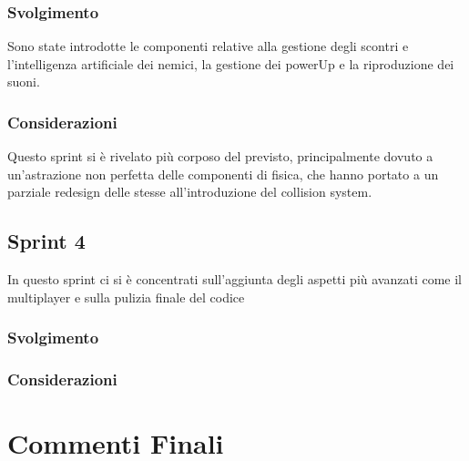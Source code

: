 \subsubsection{Svolgimento}
Sono state introdotte le componenti relative alla gestione degli scontri e l'intelligenza artificiale dei nemici, la gestione dei powerUp e la riproduzione dei suoni.
\subsubsection{Considerazioni}
Questo sprint si è rivelato più corposo del previsto, principalmente dovuto a un'astrazione non perfetta delle componenti di fisica, che hanno portato a un parziale redesign delle stesse all'introduzione del collision system.
\subsection{Sprint 4}
In questo sprint ci si è concentrati sull'aggiunta degli aspetti più avanzati come il multiplayer e sulla pulizia finale del codice
\subsubsection{Svolgimento}

\subsubsection{Considerazioni}
\section{Commenti Finali}